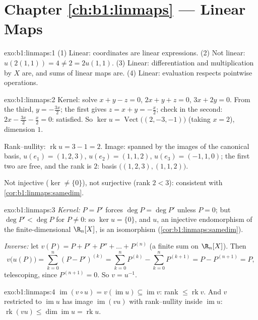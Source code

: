 \section*{Chapter \ref{ch:b1:linmaps} --- Linear Maps}

\begin{solution}{exo:b1:linmaps:1}
(1) Linear: coordinates are linear expressions. (2) Not linear:
$u(2(1,1)) = 4 \neq 2 = 2u(1,1)$. (3) Linear: differentiation and
multiplication by $X$ are, and sums of linear maps are. (4) Linear:
evaluation respects pointwise operations.
\end{solution}

\begin{solution}{exo:b1:linmaps:2}
Kernel: solve $x + y - z = 0$, $2x + y + z = 0$, $3x + 2y = 0$.
From the third, $y = -\frac{3x}{2}$; the first gives $z = x + y =
-\frac x2$; check in the second: $2x - \frac{3x}{2} - \frac x2 = 0$:
satisfied. So $\ker u = \operatorname{Vect}\bigl((2, -3, -1)\bigr)$
(taking $x = 2$), dimension $1$.

Rank--nullity: $\operatorname{rk} u = 3 - 1 = 2$. Image: spanned by
the images of the canonical basis, $u(e_1) = (1,2,3)$, $u(e_2) =
(1,1,2)$, $u(e_3) = (-1,1,0)$; the first two are free, and the rank
is $2$: basis $\bigl((1,2,3), (1,1,2)\bigr)$.

Not injective ($\ker \neq \{0\}$), not surjective (rank $2 < 3$):
consistent with \cref{cor:b1:linmaps:samedim}.
\end{solution}

\begin{solution}{exo:b1:linmaps:3}
\emph{Kernel:} $P = P'$ forces $\deg P = \deg P'$ unless $P = 0$;
but $\deg P' < \deg P$ for $P \neq 0$: so $\ker u = \{0\}$, and $u$,
an injective endomorphism of the finite-dimensional $\R_n[X]$, is an
isomorphism (\cref{cor:b1:linmaps:samedim}).

\emph{Inverse:} let $v(P) = P + P' + P'' + \dots + P^{(n)}$ (a
finite sum on $\R_n[X]$). Then
\[
v\bigl(u(P)\bigr) = \sum_{k=0}^{n} (P - P')^{(k)}
= \sum_{k=0}^{n} P^{(k)} - \sum_{k=0}^{n} P^{(k+1)}
= P - P^{(n+1)} = P ,
\]
telescoping, since $P^{(n+1)} = 0$. So $v = u^{-1}$.
\end{solution}

\begin{solution}{exo:b1:linmaps:4}
$\operatorname{im}(v \circ u) = v(\operatorname{im} u) \subseteq
\operatorname{im} v$: rank $\leq \operatorname{rk} v$. And $v$
restricted to $\operatorname{im} u$ has image
$\operatorname{im}(vu)$ with rank--nullity inside
$\operatorname{im} u$: $\operatorname{rk}(vu) \leq
\dim\operatorname{im} u = \operatorname{rk} u$.
\end{solution}

